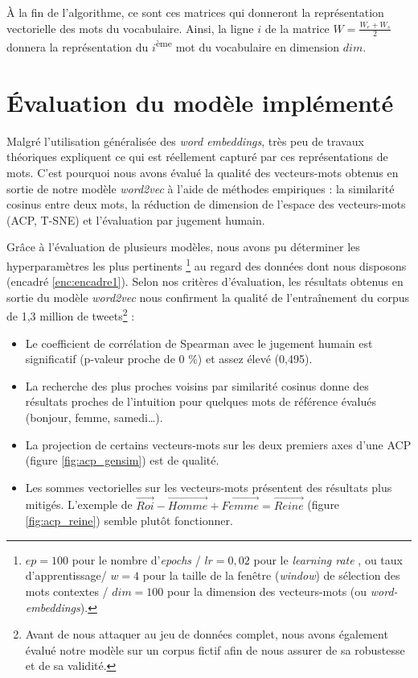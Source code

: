 \documentclass[10pt,french,french]{article}
\let\rmarkdownfootnote\footnote%
\def\footnote{\protect\rmarkdownfootnote}
\begin{document}
À la fin de l'algorithme, ce sont ces matrices qui donneront la représentation vectorielle des mots du vocabulaire.
Ainsi, la ligne \(i\) de la matrice \(W=\frac{W_e+W_s}{2}\) donnera la représentation du \(i\)\textsuperscript{ème} mot du vocabulaire en dimension \(dim\).

\newpage

\hypertarget{sec:evaluation}{%
\section{Évaluation du modèle implémenté}\label{sec:evaluation}}

Malgré l'utilisation généralisée des \emph{word embeddings}, très peu de travaux théoriques expliquent ce qui est réellement capturé par ces représentations de mots.
C'est pourquoi nous avons évalué la qualité des vecteurs-mots obtenus en sortie de notre modèle \emph{word2vec} à l'aide de méthodes empiriques : la similarité cosinus entre deux mots, la réduction de dimension de l'espace des vecteurs-mots (ACP, T-SNE) et l'évaluation par jugement humain.

Grâce à l'évaluation de plusieurs modèles, nous avons pu déterminer les hyperparamètres les plus pertinents
\footnote{
$ep = 100$ pour le nombre d'\og \emph{epochs} \fg / $lr = 0,02$ pour le \og \emph{learning rate} \fg, ou taux d'apprentissage/ $w = 4$ pour la taille de la fenêtre (\emph{window}) de sélection des mots contextes / $dim = 100$ pour la dimension des vecteurs-mots (ou \emph{word-embeddings}).
} au regard des données dont nous disposons (encadré \ref{enc:encadre1}).
Selon nos critères d'évaluation, les résultats obtenus en sortie du modèle \emph{word2vec} nous confirment la qualité de l'entraînement du corpus de 1,3 million de tweets\footnote{Avant de nous attaquer au jeu de données complet, nous avons également évalué notre modèle sur un corpus fictif afin de nous assurer de sa robustesse et de sa validité.} :

\begin{itemize}
\item Le coefficient de corrélation de Spearman avec le jugement humain est significatif (p-valeur proche de 0 \%) et assez élevé (0,495).
\item La recherche des plus proches voisins par similarité cosinus donne des résultats proches de l'intuition pour quelques mots de référence évalués (bonjour, femme, samedi\dots).
\item La projection de certains vecteurs-mots sur les deux premiers axes d'une ACP (figure \ref{fig:acp_gensim}) est de qualité.
\item Les sommes vectorielles sur les vecteurs-mots présentent des résultats plus mitigés. L'exemple de  $\overrightarrow{Roi} - \overrightarrow{Homme} + \overrightarrow{Femme} = \overrightarrow{Reine}$ (figure \ref{fig:acp_reine}) semble plutôt fonctionner. 
\end{itemize}
\end{document}
